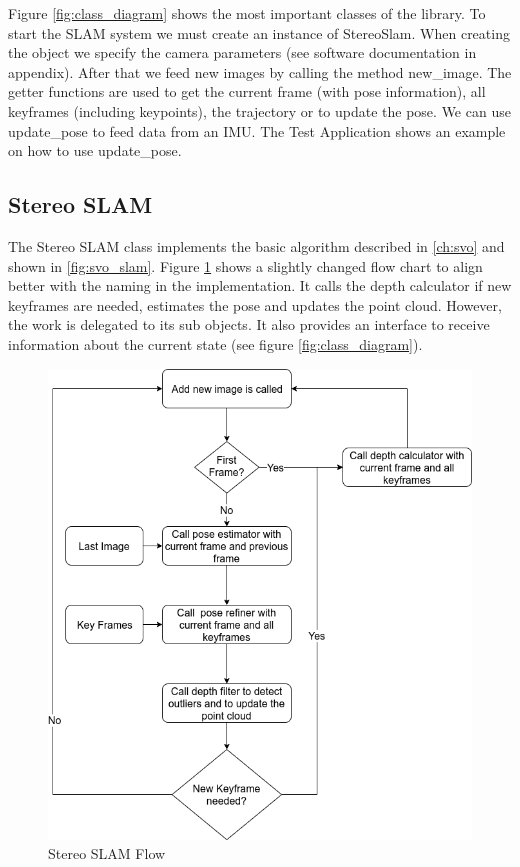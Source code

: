 \documentclass[11pt,a4paper,titlepage,oneside]{report}
\begin{document}
Figure \ref{fig:class_diagram} shows the most important classes of the library. To start the SLAM system we must create an instance of StereoSlam. When creating the object we specify the camera parameters (see software documentation in appendix). After that we feed new images by calling the method new\_image. The getter functions are used to get the current frame (with pose information), all keyframes (including keypoints), the trajectory or to update the pose. We can use update\_pose to feed data from an IMU. The Test Application shows an example on how to use update\_pose.

\subsection{Stereo SLAM}

The Stereo SLAM class implements the basic algorithm described in \ref{ch:svo} and shown in \ref{fig:svo_slam}. Figure \ref{fig:flow_stereo_slam} shows a slightly changed flow chart to align better with the naming in the implementation. It calls the depth calculator if new keyframes are needed, estimates the pose and updates the point cloud. However, the work is delegated to its sub objects. It also provides an interface to receive information about the current state (see figure \ref{fig:class_diagram}).

\begin{figure}[H]
  \centering
  \includegraphics[scale=0.3]{img/flow_stereo_slam.png}
  \caption{Stereo SLAM Flow}\label{fig:flow_stereo_slam}
\end{figure}
\end{document}
